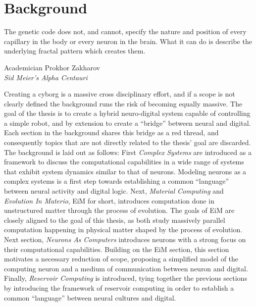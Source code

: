 \chapter{Background}
\epigraph{
The genetic code does not, and cannot, specify the nature and position of every
capillary in the body or every neuron in the brain. What it can do is describe
the underlying fractal pattern which creates them.}{Academician Prokhor
Zakharov \\\textit{Sid Meier's Alpha Centauri}}
Creating a cyborg is a massive cross disciplinary effort, and if a scope is not
clearly defined the background runs the risk of becoming equally massive.
The goal of the thesis is to create a hybrid neuro-digital system capable of
controlling a simple robot, and by extension to create a ``bridge'' between
neural and digital.
Each section in the background shares this bridge as a red thread, and
consequently topics that are not directly related to the thesis' goal are discarded.
The background is laid out as follows:
First \emph{Complex Systems} are introduced as a framework to discuss the computational
capabilities in a wide range of systems that exhibit system dynamics similar to
that of neurons.
Modeling neurons as a complex systems is a first step towards establishing a
common ``language'' between neural activity and digital logic.
%
Next, \emph{Material Computing} and \emph{Evolution In Materio}, EiM for short,
introduces computation done in unstructured matter through the process of
evolution. The goals of EiM are closely aligned to the goal of this thesis, as
both study massively parallel computation happening in physical matter shaped by
the process of evolution.
%
Next section, \emph{Neurons As Computers} introduces neurons with a strong focus
on their computational capabilities.
Building on the EiM section, this section motivates a necessary reduction of
scope, proposing a simplified model of the computing neuron and a medium of
communication between neuron and digital.
%
Finally, \emph{Reservoir Computing} is introduced, tying together the previous
sections by introducing the framework of reservoir computing in order to
establish a common ``language'' between neural cultures and digital.
%
